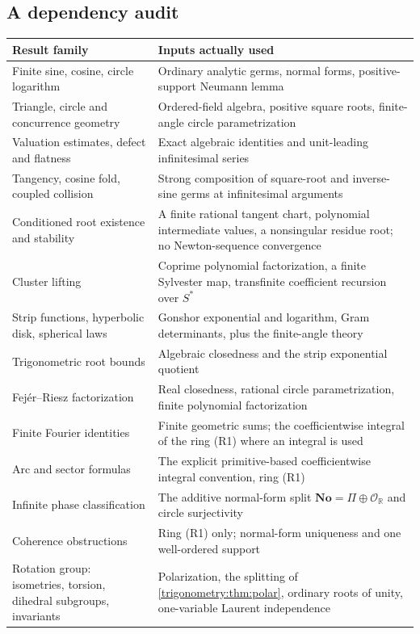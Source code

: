 \documentclass[11pt,letterpaper]{article}
\numberwithin{equation}{section}
\theoremstyle{definition}
\theoremstyle{remark}
\newcommand{\No}{\mathbf{No}}
\newcommand{\R}{\mathbb R}
\newcommand{\OO}{\mathcal O}
\begin{document}
\subsection{A dependency audit}
\begin{center}
\small
\begin{longtable}{L{0.28\textwidth}L{0.62\textwidth}}
\toprule
Result family & Inputs actually used\\
\midrule\endhead
Finite sine, cosine, circle logarithm & Ordinary analytic germs, normal forms, positive-support Neumann lemma\\
Triangle, circle and concurrence geometry & Ordered-field algebra, positive square roots, finite-angle circle parametrization\\
Valuation estimates, defect and flatness & Exact algebraic identities and unit-leading infinitesimal series\\
Tangency, cosine fold, coupled collision & Strong composition of square-root and inverse-sine germs at infinitesimal arguments\\
Conditioned root existence and stability & A finite rational tangent chart, polynomial intermediate values, a nonsingular residue root; no Newton-sequence convergence\\
Cluster lifting & Coprime polynomial factorization, a finite Sylvester map, transfinite coefficient recursion over $S^*$\\
Strip functions, hyperbolic disk, spherical laws & Gonshor exponential and logarithm, Gram determinants, plus the finite-angle theory\\
Trigonometric root bounds & Algebraic closedness and the strip exponential quotient\\
Fej\'er--Riesz factorization & Real closedness, rational circle parametrization, finite polynomial factorization\\
Finite Fourier identities & Finite geometric sums; the coefficientwise integral of the ring (R1) where an integral is used\\
Arc and sector formulas & The explicit primitive-based coefficientwise integral convention, ring (R1)\\
Infinite phase classification & The additive normal-form split $\No=\Pi\oplus\OO_{\R}$ and circle surjectivity\\
Coherence obstructions & Ring (R1) only; normal-form uniqueness and one well-ordered support\\
Rotation group: isometries, torsion, dihedral subgroups, invariants & Polarization, the splitting of \cref{trigonometry:thm:polar}, ordinary roots of unity, one-variable Laurent independence\\

\end{longtable}
\end{center}
\end{document}
